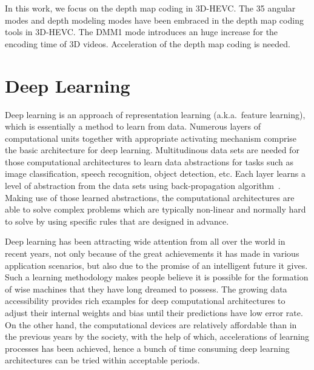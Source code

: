 In this work, we focus on the depth map coding in 3D-HEVC\@.
The 35 angular modes and depth modeling modes have been embraced in the
depth map coding tools in 3D-HEVC\@.
The DMM1 mode introduces an huge increase for the encoding time of 3D videos.
Acceleration of the depth map coding is needed.

\section{Deep Learning}\label{sec:deep-learning}
Deep learning is an approach of representation learning
(a.k.a.\ feature learning), which is essentially a method to
learn from data.
Numerous layers of computational units together with appropriate activating
mechanism comprise the basic architecture for deep learning.
Multitudinous data sets are needed for those computational architectures
to learn data abstractions
for tasks such as image classification, speech recognition,
object detection, etc.
Each layer learns a level of abstraction from the data sets using
back-propagation algorithm~\parencite{RN96}.
Making use of those learned abstractions, the computational architectures are
able to solve complex problems which are typically non-linear and normally hard
to solve by using specific rules that are designed in advance.

Deep learning has been attracting wide attention from all over the world
in recent years, not only because of the great achievements it has
made in various application scenarios, but also due to the promise of an
intelligent future it gives.
Such a learning methodology makes people believe it is possible
for the formation of wise machines
that they have long dreamed to possess.
The growing data accessibility provides rich examples for deep computational
architectures to adjust their internal weights and bias until their
predictions have low error rate.
On the other hand, the computational devices are relatively
affordable than in the previous years by the society, with the help of which,
accelerations of learning processes has been achieved, hence a bunch of
time consuming deep learning architectures can be tried within acceptable
periods.

